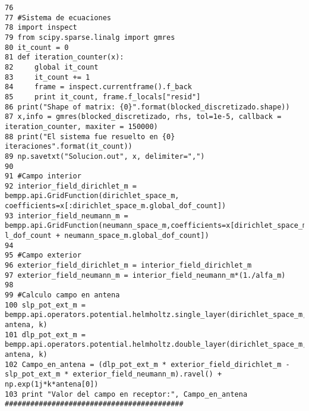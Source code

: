 \documentclass[12pt,letterpaper]{report}
\numberwithin{equation}{section}
\begin{document}
\begin{lstlisting}
76 
77 #Sistema de ecuaciones
78 import inspect
79 from scipy.sparse.linalg import gmres
80 it_count = 0
81 def iteration_counter(x):
82     global it_count
83     it_count += 1
84     frame = inspect.currentframe().f_back
85     print it_count, frame.f_locals["resid"]
86 print("Shape of matrix: {0}".format(blocked_discretizado.shape))
87 x,info = gmres(blocked_discretizado, rhs, tol=1e-5, callback = iteration_counter, maxiter = 150000)
88 print("El sistema fue resuelto en {0} iteraciones".format(it_count))
89 np.savetxt("Solucion.out", x, delimiter=",")
90 
91 #Campo interior
92 interior_field_dirichlet_m = bempp.api.GridFunction(dirichlet_space_m, coefficients=x[:dirichlet_space_m.global_dof_count])
93 interior_field_neumann_m = bempp.api.GridFunction(neumann_space_m,coefficients=x[dirichlet_space_m.global_dof_count:dirichlet_space_m.globa    l_dof_count + neumann_space_m.global_dof_count])
94 
95 #Campo exterior
96 exterior_field_dirichlet_m = interior_field_dirichlet_m
97 exterior_field_neumann_m = interior_field_neumann_m*(1./alfa_m)
98 
99 #Calculo campo en antena
100 slp_pot_ext_m = bempp.api.operators.potential.helmholtz.single_layer(dirichlet_space_m, antena, k)
101 dlp_pot_ext_m = bempp.api.operators.potential.helmholtz.double_layer(dirichlet_space_m, antena, k)
102 Campo_en_antena = (dlp_pot_ext_m * exterior_field_dirichlet_m - slp_pot_ext_m * exterior_field_neumann_m).ravel() + np.exp(1j*k*antena[0])
103 print "Valor del campo en receptor:", Campo_en_antena
##########################################

\end{lstlisting}
\end{document}
